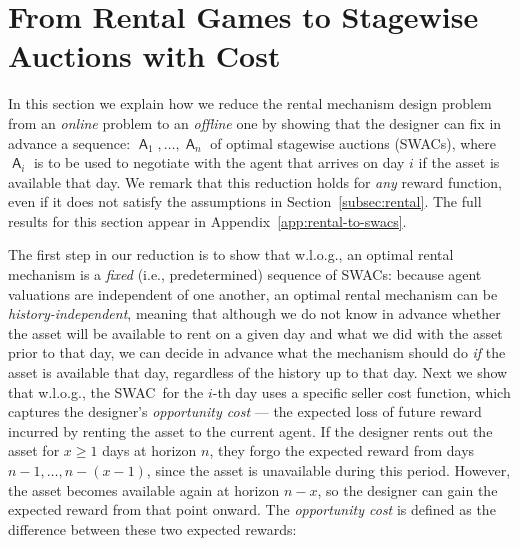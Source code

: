 \documentclass[11pt,letterpaper]{article}
\newcommand{\swac}{SWAC\xspace}
\newcommand{\swacs}{SWACs\xspace}
\DeclareMathOperator*{\E}{\bb{E}}
\newcommand{\bb}[1]{\mathbb{#1}}
\DeclareMathOperator{\A}{\auc{A}}
\theoremstyle{plain}
\newcommand{\auc}[1]{\mathsf{#1}}
\begin{document}





\section{From Rental Games to Stagewise Auctions with Cost}\label{subsec:rental-to-swacs}

In this section we  explain how we reduce the rental mechanism design problem from an \emph{online} problem to an \emph{offline} one by showing that the designer can fix in advance a sequence: $\A_1,\ldots,\A_n$ of optimal stagewise auctions (\swacs),
where $\A_i$ is to be used to negotiate with the agent that arrives on day $i$ if the asset is available that day. We remark that this reduction holds for \emph{any} reward function, even if it does not satisfy the assumptions in Section~\ref{subsec:rental}. 
The full results for this section appear in Appendix~\ref{app:rental-to-swacs}.



The first step in our reduction is to show that w.l.o.g.,
an optimal rental mechanism is a \emph{fixed} (i.e., predetermined) sequence of \swacs:
because agent valuations are independent of one another,
an optimal rental mechanism can be \emph{history-independent},
meaning that 
although we do not know in advance whether the asset will be available to rent on a given day and what we did with the asset prior to that day,
we can decide in advance what the mechanism should do \emph{if} the asset is available that day,
regardless of the history up to that day.
Next we show that w.l.o.g., the \swac\
for the $i$-th day uses a specific seller cost function,
which captures
the designer's \emph{opportunity cost} ---
the expected loss of future reward incurred by renting the asset to the current agent.
If the designer rents out the asset for $x\geq1$ days at horizon $n$,
they forgo the expected reward from days $n-1,\dots,n-(x-1)$, since the asset is unavailable during this period. 
However,
the asset becomes available again at horizon $n - x$, 
so the designer can gain the expected reward from that point onward.
The \emph{opportunity cost} is defined as the difference between these two expected rewards:
\end{document}
